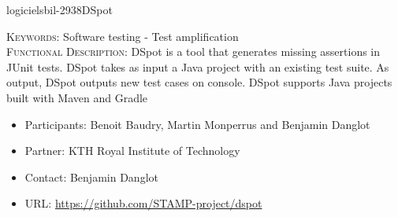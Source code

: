 \documentclass{ra2018}
\begin{document}
 \begin{module}{logiciels}{bil-2938}{DSpot}

   \textsc{Keywords:} Software testing - Test amplification \\ 


   

 \textsc{Functional Description:}  DSpot is a tool that generates missing assertions in JUnit tests. DSpot takes as input a Java project with an existing test suite. As output, DSpot outputs new test cases on console. DSpot supports Java projects built with Maven and Gradle\\

   \begin{itemize}
      \item Participants: Benoit Baudry, Martin Monperrus and Benjamin Danglot
      \item Partner: KTH Royal Institute of Technology
      \item Contact: Benjamin Danglot
      \item URL: \url{https://github.com/STAMP-project/dspot}
   \end{itemize}

 \end{module}
\end{document}

